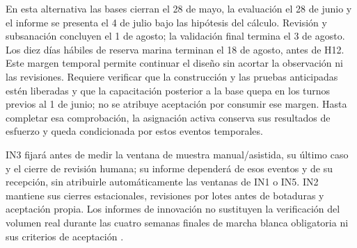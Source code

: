 En esta alternativa las bases cierran el 28 de mayo, la evaluación el 28 de junio y el informe se presenta el 4 de julio bajo las hipótesis del cálculo. Revisión y subsanación concluyen el 1 de agosto; la validación final termina el 3 de agosto. Los diez días hábiles de reserva marina terminan el 18 de agosto, antes de H12. Este margen temporal permite continuar el diseño sin acortar la observación ni las revisiones. Requiere verificar que la construcción y las pruebas anticipadas estén liberadas y que la capacitación posterior a la base quepa en los turnos previos al 1 de junio; no se atribuye aceptación por consumir ese margen. Hasta completar esa comprobación, la asignación activa conserva sus resultados de esfuerzo y queda condicionada por estos eventos temporales.

IN3 fijará antes de medir la ventana de muestra manual/asistida, su último caso y el cierre de revisión humana; su informe dependerá de esos eventos y de su recepción, sin atribuirle automáticamente las ventanas de IN1 o IN5. IN2 mantiene sus cierres estacionales, revisiones por lotes antes de botaduras y aceptación propia. Los informes de innovación no sustituyen la verificación del volumen real durante las cuatro semanas finales de marcha blanca obligatoria ni sus criterios de aceptación \parencite[art.~17.3; pp.~12--13]{bases-admin}.
